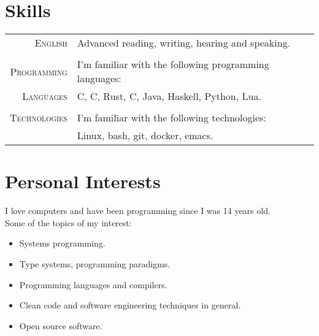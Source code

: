 \documentclass[a4paper,10pt]{article}
\newcommand{\cpp}{C\protect\scalebox{0.8}{\protect\raisebox{0.4ex}{++}}}
\renewcommand\#{\protect\scalebox{0.8}{\protect\raisebox{0.4ex}{\char"0023}}}
\begin{document}
\section{Skills}
\begin{tabular}{r|l}
  \textsc{English} & Advanced reading, writing, hearing and speaking. \\
  
  \multicolumn{2}{c}{} \\
  \textsc{Programming} & I'm familiar with the following programming languages: \\
  \textsc{Languages} & C, \cpp, Rust, C\#, Java, Haskell, Python, Lua. \\
  
  \multicolumn{2}{c}{} \\
  \textsc{Technologies} & I'm familiar with the following technologies: \\
  & Linux, bash, git, docker, emacs.
\end{tabular}


\section{Personal Interests}
I love computers and have been programming since I was 14 years old. \\
Some of the topics of my interest:
\vspace{-3pt}
\begin{itemize}
  \setlength\itemsep{-3pt}
  \item Systems programming.
  \item Type systems, programming paradigms.
  \item Programming languages and compilers.
  \item Clean code and software engineering techniques in general.
  \item Open source software.
\end{itemize} \vspace{5pt}
\end{document}
